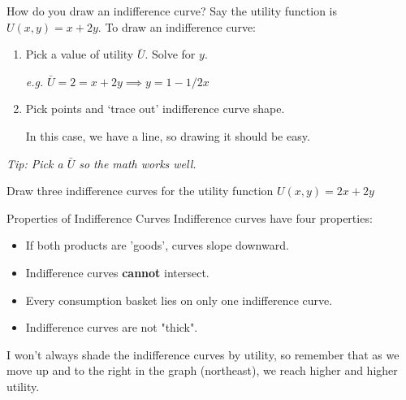 \documentclass[11pt,t]{beamer}
\begin{document}
\begin{frame}{How do you draw an indifference curve?}
  Say the utility function is $U(x, y) = x + 2y$. To draw an indifference curve:

  \bigskip
  \begin{enumerate}
    \item Pick a value of utility $\bar{U}$. Solve for $y$.
    
    \emph{e.g.} $\bar{U} = 2 = x + 2y \implies y = 1 - 1/2x$

    \item Pick points and `trace out' indifference curve shape. 
    
    In this case, we have a line, so drawing it should be easy.
  \end{enumerate}

  \bigskip
  \begin{center}
    \emph{Tip: Pick a $\bar{U}$ so the math works well.}
  \end{center}
\end{frame}

\begin{frame}

  \bigskip
  Draw three indifference curves for the utility function $U(x, y) = 2x + 2y$
\end{frame}

\begin{frame}{Properties of Indifference Curves}
  Indifference curves have four properties:

  \begin{itemize}
    \item If both products are 'goods', curves slope downward.

    \item Indifference curves \textbf{cannot} intersect.

    \item Every consumption basket lies on only one indifference curve.

    \item Indifference curves are not "thick".
  \end{itemize}

  \pause
  \bigskip
  I won't always shade the indifference curves by utility, so remember that as we move up and to the right in the graph (northeast), we reach higher and higher utility.
\end{frame}
\end{document}
